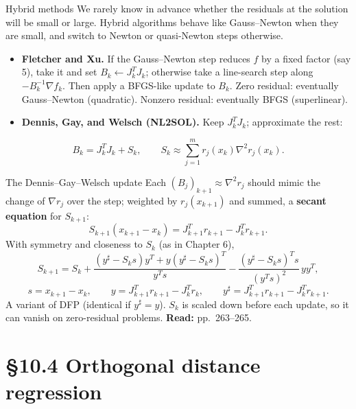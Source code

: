 \documentclass[aspectratio=169,12pt]{beamer}
\newcommand{\gradf}{\nabla f}
\newcommand{\la}{\leftarrow}
\newcommand{\readbook}[1]{{\color{red}\textbf{Read:} #1}}
\begin{document}
\begin{frame}{Hybrid methods}
  We rarely know in advance whether the residuals at the solution will be small or large.
  Hybrid algorithms behave like Gauss--Newton when they are small, and switch to Newton or
  quasi-Newton steps otherwise.

  \begin{itemize}\setlength\itemsep{0.5em}
    \item \textbf{Fletcher and Xu.} If the Gauss--Newton step reduces $f$ by a fixed factor (say 5),
      take it and set $B_{k}\la J_{k}^{T}J_{k}$; otherwise take a line-search step along $-B_{k}^{-1}\gradf_{k}$.
      Then apply a BFGS-like update to $B_{k}$. Zero residual: eventually Gauss--Newton
      (quadratic). Nonzero residual: eventually BFGS (superlinear).
    \item \textbf{Dennis, Gay, and Welsch (NL2SOL).} Keep $J_{k}^{T}J_{k}$; approximate the rest:
  \end{itemize}
  \[ B_{k}=J_{k}^{T}J_{k}+S_{k},\qquad S_{k}\approx\sum_{j=1}^{m}r_{j}(x_{k})\nabla^{2}r_{j}(x_{k}) . \]
\end{frame}

\begin{frame}{The Dennis--Gay--Welsch update}
  Each $(B_{j})_{k+1}\approx\nabla^{2}r_{j}$ should mimic the change of $\nabla r_{j}$ over the step;
  weighted by $r_{j}(x_{k+1})$ and summed, a \textbf{secant equation} for $S_{k+1}$:
  \[ S_{k+1}(x_{k+1}-x_{k})=J_{k+1}^{T}r_{k+1}-J_{k}^{T}r_{k+1} . \]
  With symmetry and closeness to $S_{k}$ (as in Chapter 6),
  \[
    S_{k+1}=S_{k}+\frac{(y^{\sharp}-S_{k}s)y^{T}+y(y^{\sharp}-S_{k}s)^{T}}{y^{T}s}
    -\frac{(y^{\sharp}-S_{k}s)^{T}s}{(y^{T}s)^{2}}\,yy^{T},
    \tag{10.43}
  \]
  \[ s=x_{k+1}-x_{k},\qquad y=J_{k+1}^{T}r_{k+1}-J_{k}^{T}r_{k},\qquad y^{\sharp}=J_{k+1}^{T}r_{k+1}-J_{k}^{T}r_{k+1} . \]
  A variant of DFP (identical if $y^{\sharp}=y$). $S_{k}$ is scaled down before each update, so it can
  vanish on zero-residual problems. \readbook{pp.~263--265.}
\end{frame}

\section{\S10.4 Orthogonal distance regression}
\end{document}
